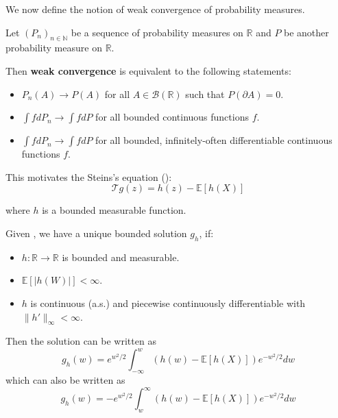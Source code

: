 \documentclass{article}
\begin{document}
We now define the notion of weak convergence of probability measures.  

\begin{definition}
   Let $(P_n)_{n\in \mathbb{N}}$ be a sequence of probability measures on $\mathbb{R}$ and $P$ be another probability measure on $\mathbb{R}$. 
   
   Then \textbf{weak convergence} is equivalent to the following statements:
   \begin{itemize}
    \item $P_n(A) \to P(A)$ for all $A \in \mathcal{B}(\mathbb{R})$ such that $P(\partial A)=0$.
    \item $\int f dP_n \to \int f dP$ for all bounded continuous functions $f$.
    \item $\int f dP_n \to \int f dP$ for all bounded, infinitely-often differentiable continuous functions $f$.
   \end{itemize}
\end{definition}

This motivates the Steins's equation ():
\begin{equation}\label{eq:stein_equation_normal}
    \mathcal{T}g(z) = h(z) - \mathbb{E}[h(X)]
\end{equation}

where $h$ is a bounded measurable function.


\begin{lemma}\label{lem:stein_equation_normal}
    Given , we have a unique bounded solution $g_h$, if:
    \begin{itemize}
        \item $h:\mathbb{R} \to \mathbb{R}$ is bounded and measurable.
        \item $\mathbb{E}[|h(W)|] < \infty$.
        \item $h$ is continuous (a.s.) and piecewise continuously differentiable with $\|h'\|_\infty < \infty$.
    \end{itemize}

        Then the solution can be written as
        \begin{equation*}
            g_h(w) = e^{w^2/2} \int_{-\infty}^w (h(w) - \mathbb{E}[h(X)]) e^{-w^2/2} dw
        \end{equation*}
        which can also be written as
        \begin{equation*}
            g_h(w) = -e^{w^2/2} \int_{w}^\infty (h(w) - \mathbb{E}[h(X)]) e^{-w^2/2} dw
        \end{equation*}
    \end{lemma}
\end{document}

